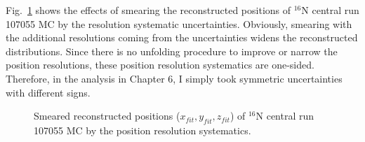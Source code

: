 Fig.~\ref{fig:smearXYZresol} shows the effects of smearing the reconstructed positions of $^{16}$N central run 107055 MC by the resolution systematic uncertainties. Obviously, smearing with the additional resolutions coming from the uncertainties widens the reconstructed distributions. Since there is no unfolding procedure to improve or narrow the position resolutions, these position resolution systematics are one-sided. Therefore, in the analysis in Chapter 6, I simply took symmetric uncertainties with different signs.
 
\begin{figure}
	\centering
	\caption[Smeared reconstructed positions of $^{16}$N central run 107055 MC.]{Smeared reconstructed positions ($x_{fit},y_{fit},z_{fit}$) of $^{16}$N central run 107055 MC by the position resolution systematics.\label{fig:smearXYZresol}}
\end{figure}


